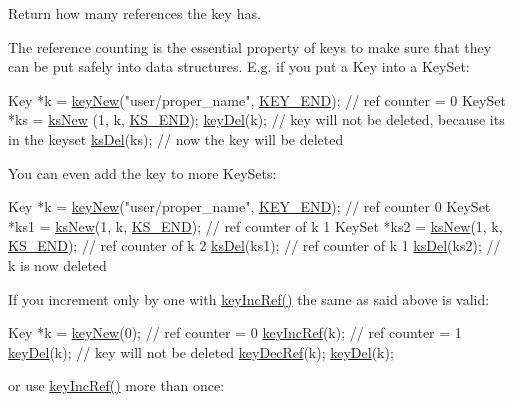 Return how many references the key has. 

The reference counting is the essential property of keys to make sure that they can be put safely into data structures. E.\+g. if you put a Key into a Key\+Set\+:


\begin{DoxyCodeInclude}
Key *k = \hyperlink{group__key_gad23c65b44bf48d773759e1f9a4d43b89}{keyNew}(\textcolor{stringliteral}{"user/proper\_name"}, \hyperlink{group__key_gga9b703ca49f48b482def322b77d3e6bc8aa8adb6fcb92dec58fb19410eacfdd403}{KEY\_END}); \textcolor{comment}{// ref counter = 0}
KeySet *ks = \hyperlink{group__keyset_ga671e1aaee3ae9dc13b4834a4ddbd2c3c}{ksNew} (1, k, \hyperlink{group__keyset_ga7a28fce3773b2c873c94ac80b8b4cd54}{KS\_END});
\hyperlink{group__key_ga3df95bbc2494e3e6703ece5639be5bb1}{keyDel}(k); \textcolor{comment}{// key will not be deleted, because its in the keyset}
\hyperlink{group__keyset_ga27e5c16473b02a422238c8d970db7ac8}{ksDel}(ks); \textcolor{comment}{// now the key will be deleted}
\end{DoxyCodeInclude}
 You can even add the key to more Key\+Sets\+:


\begin{DoxyCodeInclude}
Key *k = \hyperlink{group__key_gad23c65b44bf48d773759e1f9a4d43b89}{keyNew}(\textcolor{stringliteral}{"user/proper\_name"}, \hyperlink{group__key_gga9b703ca49f48b482def322b77d3e6bc8aa8adb6fcb92dec58fb19410eacfdd403}{KEY\_END}); \textcolor{comment}{// ref counter 0}
KeySet *ks1 = \hyperlink{group__keyset_ga671e1aaee3ae9dc13b4834a4ddbd2c3c}{ksNew}(1, k, \hyperlink{group__keyset_ga7a28fce3773b2c873c94ac80b8b4cd54}{KS\_END}); \textcolor{comment}{// ref counter of k 1}
KeySet *ks2 = \hyperlink{group__keyset_ga671e1aaee3ae9dc13b4834a4ddbd2c3c}{ksNew}(1, k, \hyperlink{group__keyset_ga7a28fce3773b2c873c94ac80b8b4cd54}{KS\_END}); \textcolor{comment}{// ref counter of k 2}
\hyperlink{group__keyset_ga27e5c16473b02a422238c8d970db7ac8}{ksDel}(ks1); \textcolor{comment}{// ref counter of k 1}
\hyperlink{group__keyset_ga27e5c16473b02a422238c8d970db7ac8}{ksDel}(ks2); \textcolor{comment}{// k is now deleted}
\end{DoxyCodeInclude}
 If you increment only by one with \hyperlink{group__key_ga6970a6f254d67af7e39f8e469bb162f1}{key\+Inc\+Ref()} the same as said above is valid\+:


\begin{DoxyCodeInclude}
Key *k = \hyperlink{group__key_gad23c65b44bf48d773759e1f9a4d43b89}{keyNew}(0); \textcolor{comment}{// ref counter = 0}
\hyperlink{group__key_ga6970a6f254d67af7e39f8e469bb162f1}{keyIncRef}(k); \textcolor{comment}{// ref counter = 1}
\hyperlink{group__key_ga3df95bbc2494e3e6703ece5639be5bb1}{keyDel}(k); \textcolor{comment}{// key will not be deleted}
\hyperlink{group__key_ga2c6433ca22109e4e141946057eccb283}{keyDecRef}(k);
\hyperlink{group__key_ga3df95bbc2494e3e6703ece5639be5bb1}{keyDel}(k);
\end{DoxyCodeInclude}
 or use \hyperlink{group__key_ga6970a6f254d67af7e39f8e469bb162f1}{key\+Inc\+Ref()} more than once\+:


